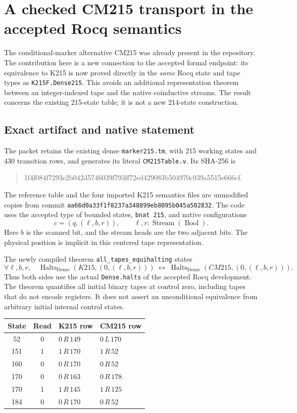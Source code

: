 \section{A checked CM215 transport in the accepted Rocq semantics}
\label{sec:cm-native-stream}

The conditional-marker alternative CM215 was already present in the repository.
The contribution here is a new connection to the accepted formal endpoint:
its equivalence to K215 is now proved directly in the \emph{same} Rocq
state and tape types as \texttt{K215F.Dense215}. This avoids an additional
representation theorem between an integer-indexed tape and the native
coinductive streams. The result concerns the existing 215-state table; it
is not a new 214-state construction.

\subsection{Exact artifact and native statement}

The packet retains the existing dense \texttt{marker215.tm}, with 215 working
states and 430 transition rows, and generates its literal
\texttt{CM215Table.v}. Its SHA-256 is
\begin{quote}\small\ttfamily
1f4f084f7293e2b042d5746039f793ff72ed429083b504970c939a5515e666cf.
\end{quote}
The reference table and the four imported K215 semantics files are unmodified
copies from commit \texttt{aa66d0a33f1f8237a348899eb8095b045a502832}.
The code uses the accepted type of bounded states, \texttt{bnat 215}, and
native configurations
\[
   c=(q,(\ell,b,r)),\qquad
   \ell,r:\operatorname{Stream}(\operatorname{Bool}).
\]
Here $b$ is the scanned bit, and the stream heads are the two adjacent bits.
The physical position is implicit in this centered tape representation.

The newly compiled theorem \texttt{all\_tapes\_equihalting} states
\[
 \forall\ell,b,r,\quad
 \operatorname{Halts}_{\mathrm{Dense}}(K215,(0,(\ell,b,r)))
 \ \longleftrightarrow\
 \operatorname{Halts}_{\mathrm{Dense}}(CM215,(0,(\ell,b,r))).
\]
Thus both sides use the actual \texttt{Dense.halts} of the accepted
Rocq development. The theorem quantifies all initial binary tapes at control
zero, including tapes that do not encode registers. It does not assert an
unconditional equivalence from arbitrary initial internal control states.

\begin{center}
\begin{tabular}{ccll}
\hline
State & Read & K215 row & CM215 row\\
\hline
52  &0& $0\,R\,149$ & $0\,L\,170$\\
151 &1& $1\,R\,170$ & $1\,R\,52$\\
160 &0& $0\,R\,170$ & $0\,R\,52$\\
170 &0& $0\,R\,163$ & $0\,R\,178$\\
170 &1& $1\,R\,145$ & $1\,R\,125$\\
184 &0& $0\,R\,170$ & $0\,R\,52$\\
\hline
\end{tabular}
\end{center}

